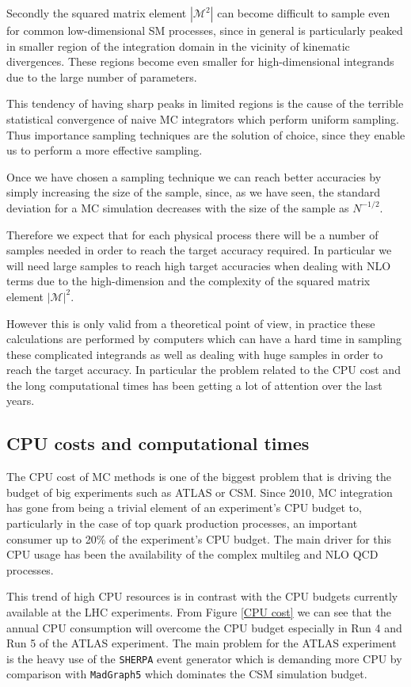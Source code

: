 \documentclass[../main/main.tex]{subfiles}
\begin{document}
Secondly the squared matrix element $|\mathcal{M}^2|$ can become difficult to sample even for common low-dimensional SM processes, since 
in general is particularly peaked in smaller region of the integration domain in the vicinity of kinematic divergences. These regions become even smaller for high-dimensional integrands due to the large number of parameters.

This tendency of having sharp peaks in limited regions is the cause of the terrible statistical convergence of naive MC integrators which 
perform uniform sampling. Thus importance sampling techniques are the solution of choice, since they enable us to perform a more effective 
sampling.

Once we have chosen a sampling technique we can reach better accuracies by simply increasing the size of the sample, since, as we have seen, the 
standard deviation for a MC simulation decreases with the size of the sample as $N^{-1/2}$.

Therefore we expect that for each physical process there will be a number of samples needed in order to reach the target accuracy required. 
In particular we will need large samples to reach high target accuracies when dealing with NLO terms due to the high-dimension and the 
complexity of the squared matrix element $|\mathcal{M}|^2$.

However this is only valid from a theoretical point of view, in practice these calculations are performed by computers which can have a hard time
in sampling these complicated integrands as well as dealing with huge samples in order to reach the target accuracy.
In particular the problem related to the CPU cost and the long computational times has been getting a lot of attention over the last years.



\subsection{CPU costs and computational times}
The CPU cost of MC methods is one of the biggest problem that is driving the budget of big experiments such as ATLAS or CSM.
Since 2010, MC integration has gone from being a trivial element of an experiment's CPU budget to, particularly in the case of top 
quark production processes, an important consumer up to 20\% of the experiment's CPU budget. 
The main driver for this CPU usage has been the availability of the complex multileg and NLO QCD processes. 

This trend of high CPU resources  is in contrast with the CPU budgets currently available at the LHC experiments.   
From Figure \ref{CPU cost} we can see that the annual CPU consumption will overcome the CPU budget especially in Run 4 and Run 5 of the ATLAS
experiment. 
The main problem for the ATLAS experiment is the heavy use of the \texttt{SHERPA} event generator which is demanding more CPU  by comparison with
\texttt{MadGraph5} which dominates the CSM simulation budget. 
\end{document}

